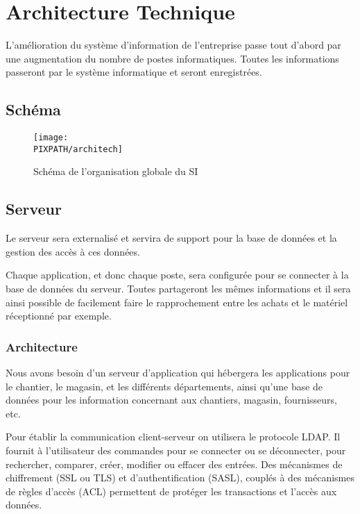 \section{Architecture Technique}
L'amélioration du système d’information de l'entreprise passe tout d'abord
par une augmentation du nombre de postes informatiques. Toutes les
informations passeront par le système informatique et seront enregistrées.

\subsection{Schéma}

\begin{figure}[!h]
\begin{center}
\texttt{[image: \\PIXPATH/architech]}
\caption{Schéma de l'organisation globale du SI}
\end{center}
\end{figure}


\subsection{Serveur}

Le serveur sera externalisé et servira de support pour la base de
données et la gestion des accès à ces données. 

Chaque application, et donc chaque poste, sera configurée pour se connecter
à la base de données du serveur.  Toutes partageront les mêmes informations
et il sera ainsi possible de facilement faire le rapprochement entre les
achats et le matériel réceptionné par exemple.

	\subsubsection{Architecture}
Nous avons besoin d'un serveur d'application qui hébergera les applications
pour le chantier, le magasin, et les différents départements,  ainsi qu'une
base de données pour les information concernant aux chantiers, magasin,
fournisseurs, etc. 

Pour établir la communication client-serveur on utilisera le protocole
LDAP. Il fournit à l'utilisateur des commandes pour se connecter ou se
déconnecter,  pour rechercher, comparer, créer, modifier ou effacer des
entrées.  Des mécanismes de chiffrement (SSL ou TLS) et d'authentification
(SASL), couplés à des mécanismes de règles d'accès (ACL) permettent de
protéger les transactions et l'accès aux données.

